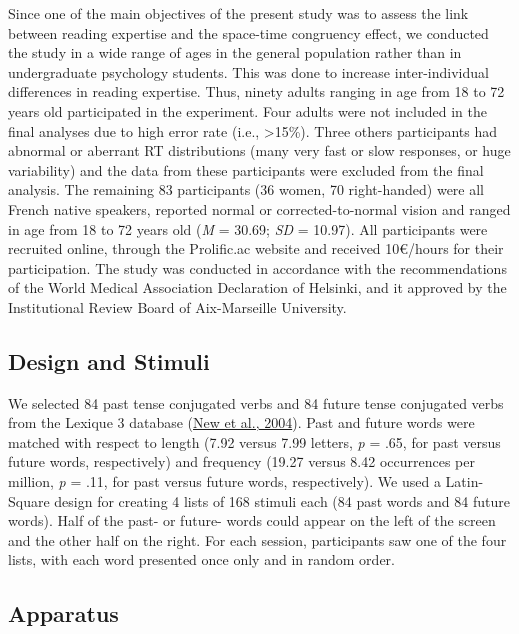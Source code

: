\documentclass[
  a4paper,12pt,twoside,onecolumn,openright,final,oldfontcommands]{memoir}
\begin{document}
Since one of the main objectives of the present study was to assess the link between reading expertise and the space-time congruency effect, we conducted the study in a wide range of ages in the general population rather than in undergraduate psychology students. This was done to increase inter-individual differences in reading expertise. Thus, ninety adults ranging in age from 18 to 72 years old participated in the experiment. Four adults were not included in the final analyses due to high error rate (i.e., \textgreater15\%). Three others participants had abnormal or aberrant RT distributions (many very fast or slow responses, or huge variability) and the data from these participants were excluded from the final analysis. The remaining 83 participants (36 women, 70 right-handed) were all French native speakers, reported normal or corrected-to-normal vision and ranged in age from 18 to 72 years old (\emph{M} = 30.69; \emph{SD} = 10.97). All participants were recruited online, through the Prolific.ac website and received 10€/hours for their participation. The study was conducted in accordance with the recommendations of the World Medical Association Declaration of Helsinki, and it approved by the Institutional Review Board of Aix-Marseille University.

\hypertarget{design-and-stimuli-2}{%
\subsection{Design and Stimuli}\label{design-and-stimuli-2}}

We selected 84 past tense conjugated verbs and 84 future tense conjugated verbs from the Lexique 3 database (\protect\hyperlink{ref-new_lexique_2004}{New et al., 2004}). Past and future words were matched with respect to length (7.92 versus 7.99 letters, \emph{p} = .65, for past versus future words, respectively) and frequency (19.27 versus 8.42 occurrences per million, \emph{p} = .11, for past versus future words, respectively). We used a Latin-Square design for creating 4 lists of 168 stimuli each (84 past words and 84 future words). Half of the past- or future- words could appear on the left of the screen and the other half on the right. For each session, participants saw one of the four lists, with each word presented once only and in random order.

\hypertarget{apparatus-2}{%
\subsection{Apparatus}\label{apparatus-2}}
\end{document}
